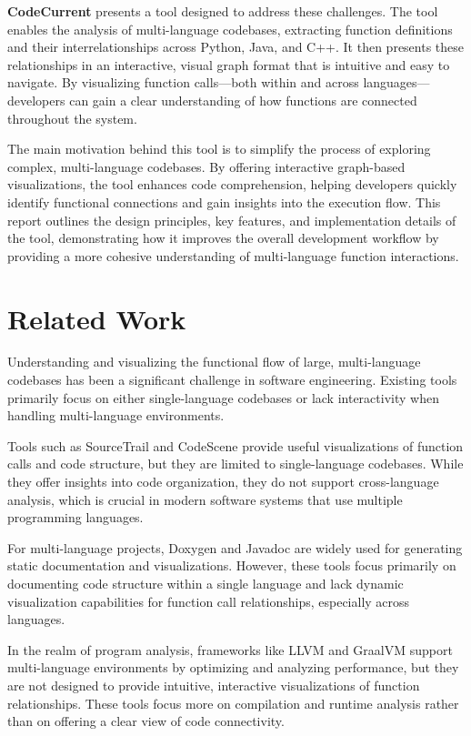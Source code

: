 \documentclass[10pt,twocolumn]{article}
\begin{document}
\textbf{CodeCurrent} presents a tool designed to address these challenges. The tool enables the analysis of multi-language codebases, extracting function definitions and their interrelationships across Python, Java, and C++. It then presents these relationships in an interactive, visual graph format that is intuitive and easy to navigate. By visualizing function calls—both within and across languages—developers can gain a clear understanding of how functions are connected throughout the system.

The main motivation behind this tool is to simplify the process of exploring complex, multi-language codebases. By offering interactive graph-based visualizations, the tool enhances code comprehension, helping developers quickly identify functional connections and gain insights into the execution flow. This report outlines the design principles, key features, and implementation details of the tool, demonstrating how it improves the overall development workflow by providing a more cohesive understanding of multi-language function interactions.


\section{Related Work}

Understanding and visualizing the functional flow of large, multi-language codebases has been a significant challenge in software engineering. Existing tools primarily focus on either single-language codebases or lack interactivity when handling multi-language environments.

Tools such as SourceTrail \cite{sourcetrail} and CodeScene \cite{codescene} provide useful visualizations of function calls and code structure, but they are limited to single-language codebases. While they offer insights into code organization, they do not support cross-language analysis, which is crucial in modern software systems that use multiple programming languages.

For multi-language projects, Doxygen \cite{doxygen} and Javadoc are widely used for generating static documentation and visualizations. However, these tools focus primarily on documenting code structure within a single language and lack dynamic visualization capabilities for function call relationships, especially across languages.

In the realm of program analysis, frameworks like LLVM \cite{llvm} and GraalVM \cite{graalvm} support multi-language environments by optimizing and analyzing performance, but they are not designed to provide intuitive, interactive visualizations of function relationships. These tools focus more on compilation and runtime analysis rather than on offering a clear view of code connectivity.
\end{document}
